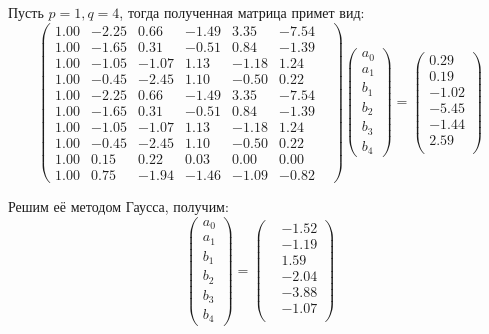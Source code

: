 \documentclass[a4paper, fontsize=14pt]{article}
\begin{document}
Пусть $p = 1, q = 4$, тогда полученная матрица примет вид:
\begin{equation*}
    \begin{pmatrix}
        1.00&  -2.25&   0.66&  -1.49&   3.35&  -7.54& \\
        1.00&  -1.65&   0.31&  -0.51&   0.84&  -1.39& \\
        1.00&  -1.05&  -1.07&   1.13&  -1.18&   1.24& \\
        1.00&  -0.45&  -2.45&   1.10&  -0.50&   0.22& \\
        1.00&  -2.25&   0.66&  -1.49&   3.35&  -7.54& \\ 
        1.00&  -1.65&   0.31&  -0.51&   0.84&  -1.39& \\           
        1.00&  -1.05&  -1.07&   1.13&  -1.18&   1.24& \\           
        1.00&  -0.45&  -2.45&   1.10&  -0.50&   0.22& \\                    
        1.00&   0.15&   0.22&   0.03&   0.00&   0.00& \\                                   
        1.00&   0.75&  -1.94&  -1.46&  -1.09&  -0.82&
    \end{pmatrix}
    \begin{pmatrix}
        a_0 \\
        a_1 \\
        b_1 \\
        b_2 \\
        b_3 \\
        b_4 
    \end{pmatrix}   
    =
    \begin{pmatrix}
        0.29\\  0.19\\ -1.02\\ -5.45\\ -1.44\\  2.59\\
    \end{pmatrix}      
\end{equation*}

Решим её методом Гаусса, получим:
\begin{equation*}
    \begin{pmatrix}
        a_0 \\
        a_1 \\
        b_1 \\
        b_2 \\
        b_3 \\
        b_4 
    \end{pmatrix} =
    \begin{pmatrix}
        &-1.52\\ &-1.19\\  &1.59\\ &-2.04\\ &-3.88\\ &-1.07\\
    \end{pmatrix} 
\end{equation*}
\end{document}
